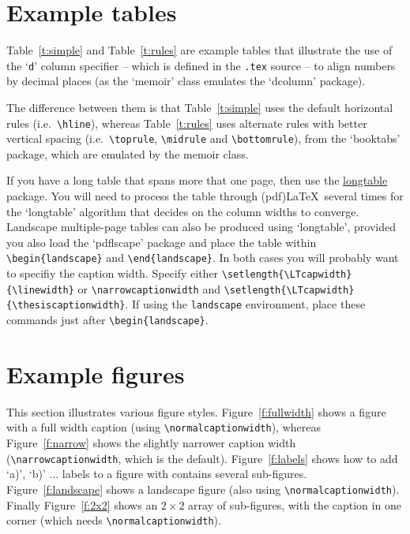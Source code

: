 \enlargethispage{\baselineskip} %

\section{Example tables}

Table~\ref{t:simple} and Table~\ref{t:rules} are example tables that
illustrate the use of the `\verb|d|' column specifier -- which is
defined in the \verb|.tex| source -- to align numbers by decimal places
(as the `memoir' class emulates the `dcolumn' package).

The difference between them is that Table~\ref{t:simple} uses the
default horizontal rules (i.e.\ \verb|\hline|), whereas
Table~\ref{t:rules} uses alternate rules with better vertical spacing
(i.e.\ \verb|\toprule|, \verb|\midrule| and \verb|\bottomrule|), from
the `booktabs' package, which are emulated by the memoir class.

If you have a long table that spans more that one page, then use the
\href{http://www.ctan.org/pkg/longtable}{longtable} package. You will
need to process the table through (pdf)\LaTeX\ several times for the
`longtable' algorithm that decides on the column widths to converge.
Landscape multiple-page tables can also be produced using `longtable',
provided you also load the `pdflscape' package and place the table
within \verb|\begin{landscape}| and \verb|\end{landscape}|. In both
cases you will probably want to specifiy the caption width. Specify
either \verb|\setlength{\LTcapwidth}{\linewidth}| or
\verb|\narrowcaptionwidth| and
\verb|\setlength{\LTcapwidth}{\thesiscaptionwidth}|. If using the
\verb|landscape| environment, place these commands just after
\verb|\begin{landscape}|.

\section{Example figures}

This section illustrates various figure styles. Figure~\ref{f:fullwidth}
shows a figure with a full width caption (using
\verb|\normalcaptionwidth|), whereas Figure~\ref{f:narrow} shows the
slightly narrower caption width (\verb|\narrowcaptionwidth|, which is
the default). Figure~\ref{f:labels} shows how to add `a)', `b)' $\dots$
labels to a figure with contains several sub-figures.
Figure~\ref{f:landscape} shows a landscape figure (also using
\verb|\normalcaptionwidth|). Finally Figure~\ref{f:2x2} shows an
$2\times2$ array of sub-figures, with the caption in one corner (which
needs \verb|\normalcaptionwidth|).

